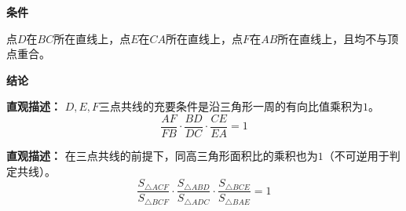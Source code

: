 \begin{statementbox}
	\textbf{\textcolor{CStatement}{条件}}
	\begin{description}[style=nextline, leftmargin=2.8em, labelsep=0.5em, itemsep=0.35em]
		\item[\textbf{\textcolor{CStatement}{条件1（分点位置）：}}] 点$D$在$BC$所在直线上，点$E$在$CA$所在直线上，点$F$在$AB$所在直线上，且均不与顶点重合。
	\end{description}

	\textbf{\textcolor{CStatement}{结论}}
	\begin{description}[style=nextline, leftmargin=2.8em, labelsep=0.5em, itemsep=0.45em]
		\item[\textbf{\textcolor{CStatement}{结论一（充要条件）：}}]
			\textbf{\textcolor{CStatement}{直观描述：}}
			$D,E,F$三点共线的充要条件是沿三角形一周的有向比值乘积为$1$。
			\[
				\frac{AF}{FB}\cdot\frac{BD}{DC}\cdot\frac{CE}{EA}=1
			\]
		\item[\textbf{\textcolor{CStatement}{推广结论（面积比值形式）：}}]
			\textbf{\textcolor{CStatement}{直观描述：}}
			在三点共线的前提下，同高三角形面积比的乘积也为$1$（不可逆用于判定共线）。
			\[
				\frac{S_{\triangle ACF}}{S_{\triangle BCF}}\cdot\frac{S_{\triangle ABD}}{S_{\triangle ADC}}\cdot\frac{S_{\triangle BCE}}{S_{\triangle BAE}}=1
			\]
	\end{description}
\end{statementbox}
